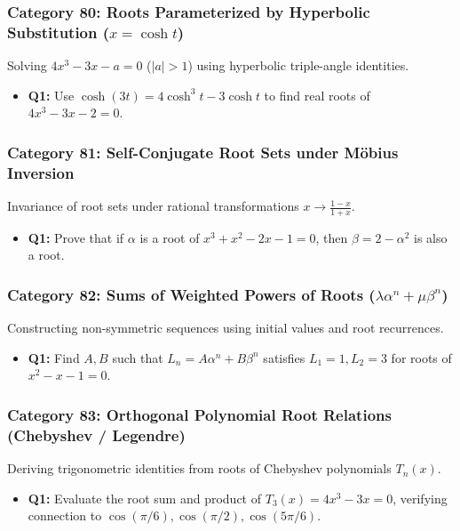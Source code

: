 \documentclass[10pt,a4paper]{article}
\begin{document}
\subsubsection{Category 80: Roots Parameterized by Hyperbolic Substitution ($x = \cosh t$)}
Solving $4x^3 - 3x - a = 0$ ($|a|>1$) using hyperbolic triple-angle identities.
\begin{itemize}[leftmargin=*]
    \item \textbf{Q1:} Use $\cosh(3t) = 4\cosh^3 t - 3\cosh t$ to find real roots of $4x^3 - 3x - 2 = 0$.
\end{itemize}

\subsubsection{Category 81: Self-Conjugate Root Sets under Möbius Inversion}
Invariance of root sets under rational transformations $x \to \frac{1-x}{1+x}$.
\begin{itemize}[leftmargin=*]
    \item \textbf{Q1:} Prove that if $\alpha$ is a root of $x^3 + x^2 - 2x - 1 = 0$, then $\beta = 2 - \alpha^2$ is also a root.
\end{itemize}

\subsubsection{Category 82: Sums of Weighted Powers of Roots ($\lambda \alpha^n + \mu \beta^n$)}
Constructing non-symmetric sequences using initial values and root recurrences.
\begin{itemize}[leftmargin=*]
    \item \textbf{Q1:} Find $A, B$ such that $L_n = A\alpha^n + B\beta^n$ satisfies $L_1 = 1, L_2 = 3$ for roots of $x^2 - x - 1 = 0$.
\end{itemize}

\subsubsection{Category 83: Orthogonal Polynomial Root Relations (Chebyshev / Legendre)}
Deriving trigonometric identities from roots of Chebyshev polynomials $T_n(x)$.
\begin{itemize}[leftmargin=*]
    \item \textbf{Q1:} Evaluate the root sum and product of $T_3(x) = 4x^3 - 3x = 0$, verifying connection to $\cos(\pi/6), \cos(\pi/2), \cos(5\pi/6)$.
\end{itemize}
\end{document}
